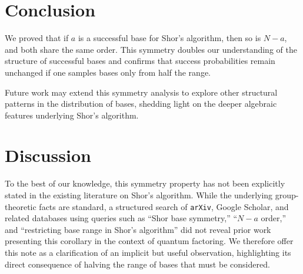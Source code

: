 \documentclass[12pt]{article}
\begin{document}
\section{Conclusion}
We proved that if $a$ is a successful base for Shor's algorithm, then so is $N-a$, and both share the same order. This symmetry doubles our understanding of the structure of successful bases and confirms that success probabilities remain unchanged if one samples bases only from half the range.

Future work may extend this symmetry analysis to explore other structural patterns in the distribution of bases, shedding light on the deeper algebraic features underlying Shor's algorithm.

\section{Discussion}
To the best of our knowledge, this symmetry property has not been explicitly stated in the existing literature on Shor's algorithm. While the underlying group-theoretic facts are standard, a structured search of \texttt{arXiv}, Google Scholar, and related databases using queries such as ``Shor base symmetry,'' ``$N-a$ order,'' and ``restricting base range in Shor's algorithm'' did not reveal prior work presenting this corollary in the context of quantum factoring. We therefore offer this note as a clarification of an implicit but useful observation, highlighting its direct consequence of halving the range of bases that must be considered.
\end{document}
